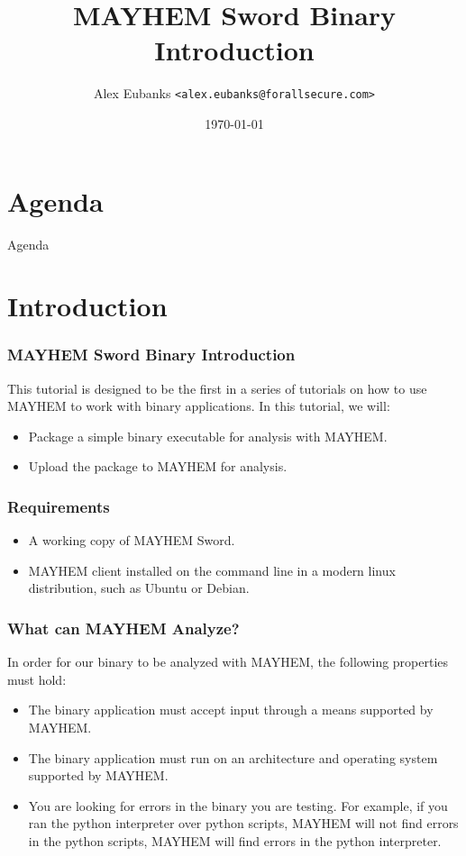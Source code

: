 \documentclass{beamer}
\title{MAYHEM Sword Binary Introduction}
\date{\today}
\author[Eubanks]{Alex Eubanks \texttt{<alex.eubanks@forallsecure.com>}}
\begin{document}
\begin{frame}
\titlepage
\end{frame}

\section{Agenda}

\begin{frame}{Agenda}
\setlength{\parskip}{0cm}
\tableofcontents
\end{frame}

\section{Introduction}

\begin{frame}
\frametitle{MAYHEM Sword Binary Introduction}
This tutorial is designed to be the first in a series of tutorials on how to use MAYHEM to work with binary applications. In this tutorial, we will:

\begin{itemize}
  \item Package a simple binary executable for analysis with MAYHEM.
  \item Upload the package to MAYHEM for analysis.
\end{itemize}
\end{frame}

\begin{frame}
\frametitle{Requirements}
\begin{itemize}
  \item A working copy of MAYHEM Sword.
  \item MAYHEM client installed on the command line in a modern linux distribution, such as Ubuntu or Debian.
\end{itemize}
\end{frame}

\begin{frame}
\frametitle{What can MAYHEM Analyze?}
In order for our binary to be analyzed with MAYHEM, the following properties must hold:

\begin{itemize}
  \item The binary application must accept input through a means supported by MAYHEM.
  \item The binary application must run on an architecture and operating system supported by MAYHEM.
  \item You are looking for errors in the binary you are testing. For example, if you ran the python interpreter over python scripts, MAYHEM will not find errors in the python scripts, MAYHEM will find errors in the python interpreter.
\end{itemize}
\end{frame}
\end{document}
